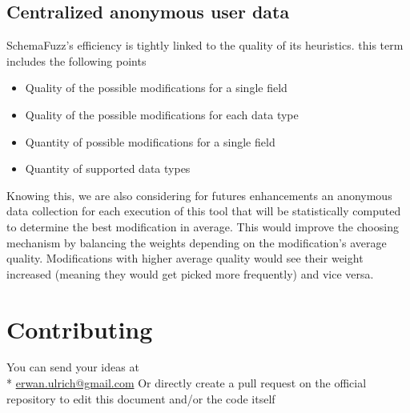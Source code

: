 \documentclass{article}
\begin{document}
\begin{empfile}
		\subsection{Centralized anonymous user data}
SchemaFuzz's efficiency is tightly linked to the quality of its heuristics. this term includes the following points 
		\begin{itemize}
		\item{Quality of the possible modifications for a single field}
		\item{Quality of the possible modifications for each data type}
		\item{Quantity of possible modifications for a single field}
		\item{Quantity of supported data types}
		\end{itemize}
Knowing this, we are also considering for futures enhancements an anonymous data collection  for each execution of this tool that will be statistically computed to determine the best modification in average. This would improve the choosing mechanism by balancing the weights  depending on the modification's average quality. Modifications with higher average quality would see their weight increased (meaning they would get picked more frequently) and vice versa. 			



	\section{Contributing}
You can send your ideas at  \\*
		\url{erwan.ulrich@gmail.com}
Or directly create a pull request on the official repository to edit this document and/or the code itself


\appendix	
\newpage

	
			
\end{empfile}
\end{document}
